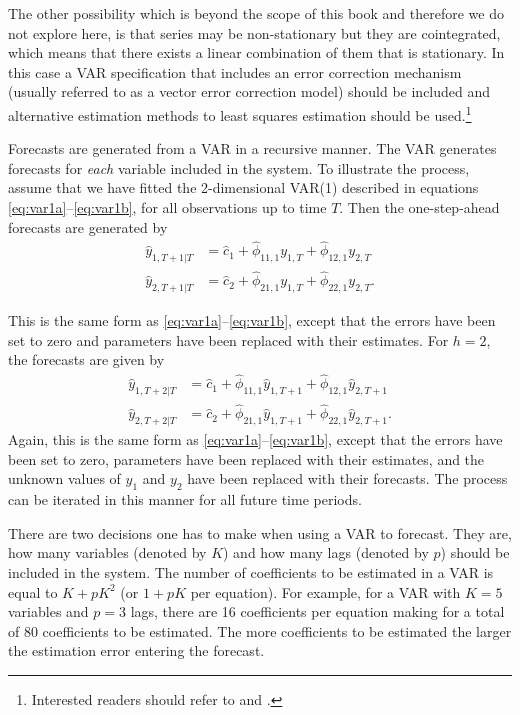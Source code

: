 \documentclass[]{book}
\let\rmarkdownfootnote\footnote%
\def\footnote{\protect\rmarkdownfootnote}
\begin{document}
The other possibility which is beyond the scope of this book and therefore we do not explore here, is that series may be non-stationary but they are cointegrated, which means that there exists a linear combination of them that is stationary. In this case a VAR specification that includes an error correction mechanism (usually referred to as a vector error correction model) should be included and alternative estimation methods to least squares estimation should be used.\footnote{Interested readers should refer to \citet{Ham1994} and \citet{Lut2007}.}

Forecasts are generated from a VAR in a recursive manner. The VAR generates forecasts for \emph{each} variable included in the system. To illustrate the process, assume that we have fitted the 2-dimensional VAR(1) described in equations \eqref{eq:var1a}--\eqref{eq:var1b}, for all observations up to time \(T\). Then the one-step-ahead forecasts are generated by
\begin{align*}
  \hat y_{1,T+1|T} &=\hat{c}_1+\hat\phi_{11,1}y_{1,T}+\hat\phi_{12,1}y_{2,T} \\
  \hat y_{2,T+1|T} &=\hat{c}_2+\hat\phi _{21,1}y_{1,T}+\hat\phi_{22,1}y_{2,T}.
\end{align*}

This is the same form as \eqref{eq:var1a}--\eqref{eq:var1b}, except that the errors have been set to zero and parameters have been replaced with their estimates. For \(h=2\), the forecasts are given by
\begin{align*}
  \hat y_{1,T+2|T} &=\hat{c}_1+\hat\phi_{11,1}\hat y_{1,T+1}+\hat\phi_{12,1}\hat y_{2,T+1}\\
  \hat y_{2,T+2|T}&=\hat{c}_2+\hat\phi_{21,1}\hat y_{1,T+1}+\hat\phi_{22,1}\hat y_{2,T+1}.
\end{align*}
Again, this is the same form as \eqref{eq:var1a}--\eqref{eq:var1b}, except that the errors have been set to zero, parameters have been replaced with their estimates, and the unknown values of \(y_1\) and \(y_2\) have been replaced with their forecasts. The process can be iterated in this manner for all future time periods.

There are two decisions one has to make when using a VAR to forecast. They are, how many variables (denoted by \(K\)) and how many lags (denoted by \(p\)) should be included in the system. The number of coefficients to be estimated in a VAR is equal to \(K+pK^2\) (or \(1+pK\) per equation). For example, for a VAR with \(K=5\) variables and \(p=3\) lags, there are 16 coefficients per equation making for a total of 80 coefficients to be estimated. The more coefficients to be estimated the larger the estimation error entering the forecast.
\end{document}
